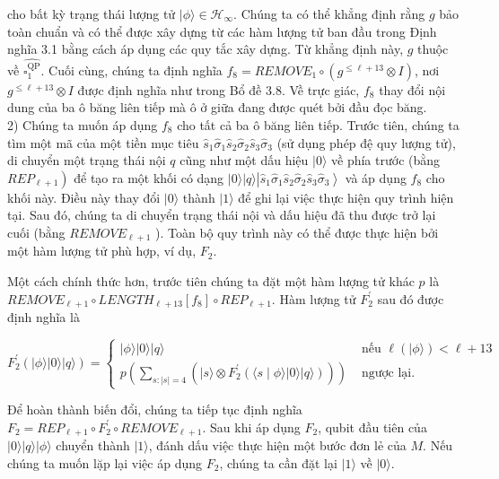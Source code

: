 \documentclass[10pt]{article}
\begin{document}
cho bất kỳ trạng thái lượng tử $|\phi\rangle \in \mathcal{H}_{\infty}$. Chúng ta có thể khẳng định rằng $g$ bảo toàn chuẩn và có thể được xây dựng từ các hàm lượng tử ban đầu trong Định nghĩa 3.1 bằng cách áp dụng các quy tắc xây dựng. Từ khẳng định này, $g$ thuộc về $\widehat{\square_{1}^{\mathrm{QP}}}$. Cuối cùng, chúng ta định nghĩa $f_{8}=R E M O V E_{1} \circ\left(g^{\leq \ell+13} \otimes I\right)$, nơi $g^{\leq \ell+13} \otimes I$ được định nghĩa như trong Bổ đề 3.8. Về trực giác, $f_{8}$ thay đổi nội dung của ba ô băng liên tiếp mà ô ở giữa đang được quét bởi đầu đọc băng.\\
2) Chúng ta muốn áp dụng $f_{8}$ cho tất cả ba ô băng liên tiếp. Trước tiên, chúng ta tìm một mã của một tiền mục tiêu $\hat{s}_{1} \hat{\sigma}_{1} \hat{s}_{2} \hat{\sigma}_{2} \hat{s}_{3} \hat{\sigma}_{3}$ (sử dụng phép đệ quy lượng tử), di chuyển một trạng thái nội $q$ cũng như một dấu hiệu $|0\rangle$ về phía trước (bằng $\left.R E P_{\ell+1}\right)$ để tạo ra một khối có dạng $|0\rangle|q\rangle\left|\hat{s}_{1} \hat{\sigma}_{1} \hat{s}_{2} \hat{\sigma}_{2} \hat{s}_{3} \hat{\sigma}_{3}\right\rangle$ và áp dụng $f_{8}$ cho khối này. Điều này thay đổi $|0\rangle$ thành $|1\rangle$ để ghi lại việc thực hiện quy trình hiện tại. Sau đó, chúng ta di chuyển trạng thái nội và dấu hiệu đã thu được trở lại cuối (bằng $R E M O V E_{\ell+1}$ ). Toàn bộ quy trình này có thể được thực hiện bởi một hàm lượng tử phù hợp, ví dụ, $F_{2}$.

Một cách chính thức hơn, trước tiên chúng ta đặt một hàm lượng tử khác $p$ là $R E M O V E_{\ell+1} \circ L E N G T H_{\ell+13}\left[f_{8}\right] \circ R E P_{\ell+1}$. Hàm lượng tử $F_{2}^{\prime}$ sau đó được định nghĩa là

$$
F_{2}^{\prime}(|\phi\rangle|0\rangle|q\rangle)= \begin{cases}|\phi\rangle|0\rangle|q\rangle & \text { nếu } \ell(|\phi\rangle)<\ell+13 \\ p\left(\sum_{s:|s|=4}\left(|s\rangle \otimes F_{2}^{\prime}(\langle s \mid \phi\rangle|0\rangle|q\rangle)\right)\right) & \text { ngược lại. }\end{cases}
$$

Để hoàn thành biến đổi, chúng ta tiếp tục định nghĩa $F_{2}=R E P_{\ell+1} \circ F_{2}^{\prime} \circ R E M O V E_{\ell+1}$. Sau khi áp dụng $F_{2}$, qubit đầu tiên của $|0\rangle|q\rangle|\phi\rangle$ chuyển thành $|1\rangle$, đánh dấu việc thực hiện một bước đơn lẻ của $M$. Nếu chúng ta muốn lặp lại việc áp dụng $F_{2}$, chúng ta cần đặt lại $|1\rangle$ về $|0\rangle$.
\end{document}
